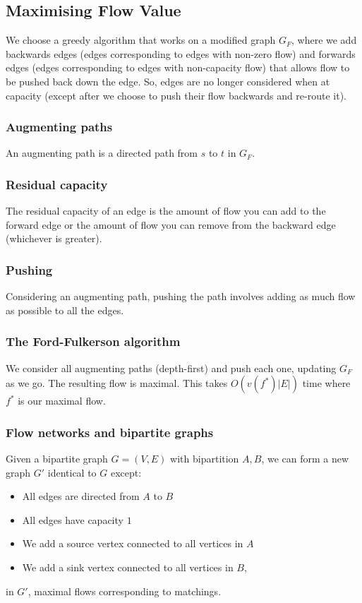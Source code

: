 \documentclass[a4paper, 12pt, twoside]{article}
\begin{document}
\subsection{Maximising Flow Value}

We choose a greedy algorithm that works on a modified graph $G_F$, where we add backwards edges
(edges corresponding to edges with non-zero flow) 
and forwards edges 
(edges corresponding to edges with non-capacity flow) 
that allows flow to be pushed back down the edge. So, edges are no longer considered when 
at capacity (except after we choose to push their flow backwards and re-route it).

\subsubsection{Augmenting paths}

An augmenting path is a directed path from $s$ to $t$ in $G_F$.

\subsubsection{Residual capacity}

The residual capacity of an edge is the amount of flow you can add to the forward edge or
the amount of flow you can remove from the backward edge (whichever is greater).

\subsubsection{Pushing}

Considering an augmenting path, pushing the path involves adding as much flow as possible to
all the edges.

\subsubsection{The Ford-Fulkerson algorithm}

We consider all augmenting paths (depth-first) and push each one, updating $G_F$ as we go. 
The resulting flow is maximal. This takes $O(v(f^*)|E|)$ time where $f^*$ is our maximal flow.

\subsubsection{Flow networks and bipartite graphs}

Given a bipartite graph $G = (V, E)$ with bipartition $A, B$, we can form a new graph
$G'$ identical to $G$ except: \begin{itemize}
  \item All edges are directed from $A$ to $B$
  \item All edges have capacity $1$
  \item We add a source vertex connected to all vertices in $A$
  \item We add a sink vertex connected to all vertices in $B$,
\end{itemize} in $G'$, maximal flows corresponding to matchings.
\end{document}
